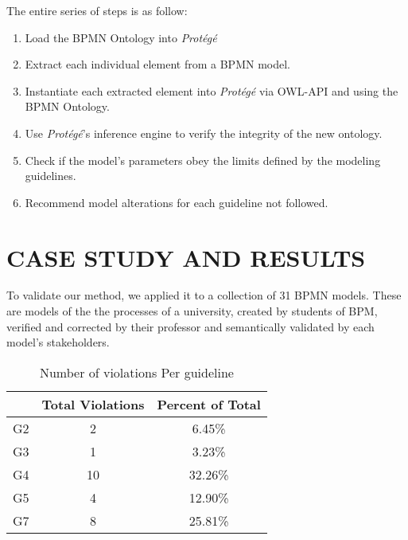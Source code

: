 \documentclass[a4paper,twoside]{article}
\begin{document}
The entire series of steps is as follow:

\begin{enumerate}
	\item Load the BPMN Ontology into \textit{Protégé}
	\item Extract each individual element from a BPMN model.
	\item Instantiate each extracted element into \textit{Protégé} via OWL-API and using the BPMN Ontology.
	\item Use \textit{Protégé}'s inference engine to verify the integrity of the new ontology.
	\item Check if the model's parameters obey the limits defined by the modeling guidelines.
	\item Recommend model alterations for each guideline not followed.
\end{enumerate}





\section{CASE STUDY AND RESULTS}\label{CaseStudy}

\noindent To validate our method, we applied it to a collection of 31 BPMN models. These are models of the the processes of a university, created by students of BPM, verified and corrected by their professor and semantically validated by each model's stakeholders. 

\begin{table}[]
	\centering
	\caption{Number of violations Per guideline}
	\label{ViolationsPerGuideline}
	\begin{tabular}{|c|c|c|}
		\hline
		& Total Violations & Percent of Total \\ \hline
		G2 & 2 & 6.45\% \\ \hline
		G3 & 1 & 3.23\% \\ \hline
		G4 & 10 & 32.26\% \\ \hline
		G5 & 4 & 12.90\% \\ \hline
		G7 & 8 & 25.81\% \\ \hline
	\end{tabular}
\end{table}
\end{document}
